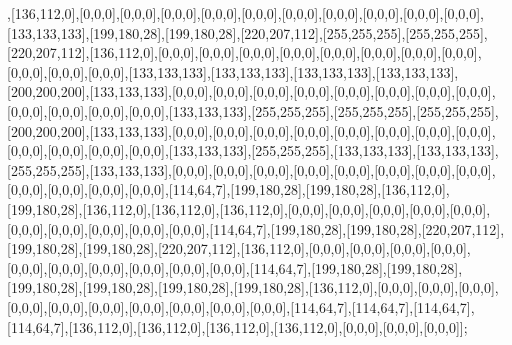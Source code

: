 ,[136,112,0],[0,0,0],[0,0,0],[0,0,0],[0,0,0],[0,0,0],[0,0,0],[0,0,0],[0,0,0],[0,0,0],[0,0,0],[133,133,133],[199,180,28],[199,180,28],[220,207,112],[255,255,255],[255,255,255],[220,207,112],[136,112,0],[0,0,0],[0,0,0],[0,0,0],[0,0,0],[0,0,0],[0,0,0],[0,0,0],[0,0,0],[0,0,0],[0,0,0],[0,0,0],[133,133,133],[133,133,133],[133,133,133],[133,133,133],[200,200,200],[133,133,133],[0,0,0],[0,0,0],[0,0,0],[0,0,0],[0,0,0],[0,0,0],[0,0,0],[0,0,0],[0,0,0],[0,0,0],[0,0,0],[0,0,0],[133,133,133],[255,255,255],[255,255,255],[255,255,255],[200,200,200],[133,133,133],[0,0,0],[0,0,0],[0,0,0],[0,0,0],[0,0,0],[0,0,0],[0,0,0],[0,0,0],[0,0,0],[0,0,0],[0,0,0],[0,0,0],[133,133,133],[255,255,255],[133,133,133],[133,133,133],[255,255,255],[133,133,133],[0,0,0],[0,0,0],[0,0,0],[0,0,0],[0,0,0],[0,0,0],[0,0,0],[0,0,0],[0,0,0],[0,0,0],[0,0,0],[0,0,0],[114,64,7],[199,180,28],[199,180,28],[136,112,0],[199,180,28],[136,112,0],[136,112,0],[136,112,0],[0,0,0],[0,0,0],[0,0,0],[0,0,0],[0,0,0],[0,0,0],[0,0,0],[0,0,0],[0,0,0],[0,0,0],[114,64,7],[199,180,28],[199,180,28],[220,207,112],[199,180,28],[199,180,28],[220,207,112],[136,112,0],[0,0,0],[0,0,0],[0,0,0],[0,0,0],[0,0,0],[0,0,0],[0,0,0],[0,0,0],[0,0,0],[0,0,0],[114,64,7],[199,180,28],[199,180,28],[199,180,28],[199,180,28],[199,180,28],[199,180,28],[136,112,0],[0,0,0],[0,0,0],[0,0,0],[0,0,0],[0,0,0],[0,0,0],[0,0,0],[0,0,0],[0,0,0],[0,0,0],[114,64,7],[114,64,7],[114,64,7],[114,64,7],[136,112,0],[136,112,0],[136,112,0],[136,112,0],[0,0,0],[0,0,0],[0,0,0]];

